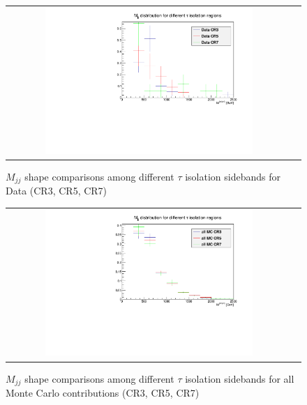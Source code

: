 \begin{figure}[tbh!]
	\centering
	\begin{tabular}{cc}
		\includegraphics[width=0.75\textwidth]{PLOTS/diTauHadLSotherPlots/LS_mjjshapestab_vs_tauiso_data.pdf}
	\end{tabular}
	\caption{$M_{jj}$ shape comparisons among different $\tau$ isolation sidebands for Data (CR3, CR5, CR7)}
	\label{fig:LS_mjjshapestab_vs_tauiso_data}
\end{figure}

\begin{figure}[tbh!]
	\centering
	\begin{tabular}{cc}
		\includegraphics[width=0.75\textwidth]{PLOTS/diTauHadLSotherPlots/LS_mjjshapestab_vs_tauiso_mc.pdf}
	\end{tabular}
	\caption{$M_{jj}$ shape comparisons among different $\tau$ isolation sidebands for all Monte Carlo contributions (CR3, CR5, CR7)}
	\label{fig:LS_mjjshapestab_vs_tauiso_mc}
\end{figure}

